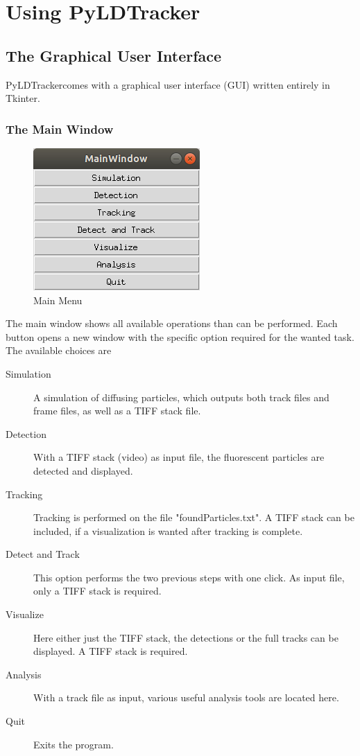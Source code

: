 \documentclass[oneside,letterpaper]{scrartcl}
\newcommand{\PN}{PyLDTracker}
\def\myscale{0.55}
\begin{document}
\section{Using \PN}\parindent 0pt

\subsection{The Graphical User Interface}

\PN comes with a graphical user interface (GUI) written entirely in Tkinter. 

\subsubsection{The Main Window}

\begin{figure}
\centering
\includegraphics[scale=\myscale]{Figures/MainGUI.jpg}
\caption{Main Menu}
\end{figure}

The main window shows all available operations than can be performed. Each button opens a new window with the specific option required for the wanted task. The available choices are

\begin{description}
\item[Simulation] A simulation of diffusing particles, which outputs both track files and frame files, as well as a TIFF stack file.
\item[Detection] With a TIFF stack (video) as input file, the fluorescent particles are detected and displayed.
\item[Tracking] Tracking is performed on the file "foundParticles.txt". A TIFF stack can be included, if a visualization is wanted after tracking is complete.
\item[Detect and Track] This option performs the two previous steps with one click. As input file, only a TIFF stack is required.
\item[Visualize] Here either just the TIFF stack, the detections or the full tracks can be displayed. A TIFF stack is required.
\item[Analysis] With a track file as input, various useful analysis tools are located here.
\item[Quit] Exits the program.
\end{description}
\end{document}
